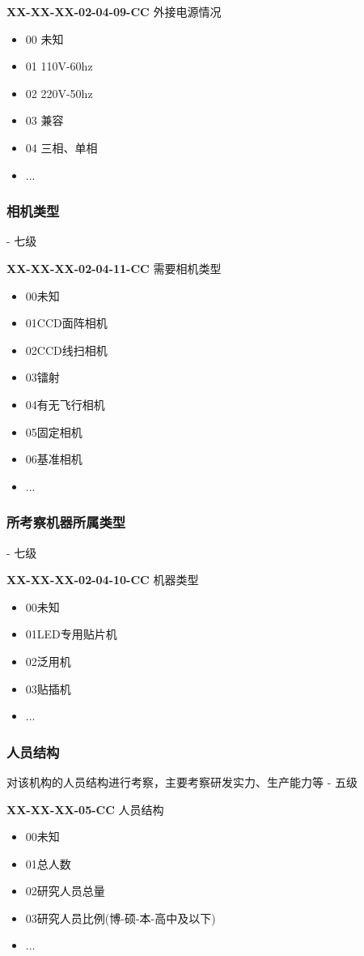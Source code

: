 \documentclass[a4paper,12pt,UTF8]{article}
\begin{document}
\textbf{XX-XX-XX-02-04-09-CC} 外接电源情况
\begin{itemize}
  \item 00 未知%
  \item 01 110V-60hz
  \item 02 220V-50hz
  \item 03 兼容
  \item 04 三相、单相
  \item ...
\end{itemize}

\subsubsection{相机类型}
- 七级

\textbf{XX-XX-XX-02-04-11-CC} 需要相机类型
\begin{itemize}
  \item 00未知%
  \item 01CCD面阵相机
  \item 02CCD线扫相机
  \item 03镭射
  \item 04有无飞行相机
  \item 05固定相机
  \item 06基准相机
  \item ...
\end{itemize}

\subsubsection{所考察机器所属类型}
- 七级

\textbf{XX-XX-XX-02-04-10-CC} 机器类型
\begin{itemize}
  \item 00未知%
  \item 01LED专用贴片机
  \item 02泛用机
  \item 03贴插机
  \item ...
\end{itemize}


\subsubsection{人员结构}
对该机构的人员结构进行考察，主要考察研发实力、生产能力等 - 五级

\textbf{XX-XX-XX-05-CC} 人员结构
\begin{itemize}
  \item 00未知%
  \item 01总人数
  \item 02研究人员总量
  \item 03研究人员比例(博-硕-本-高中及以下)
  \item ...
\end{itemize}
\end{document}
